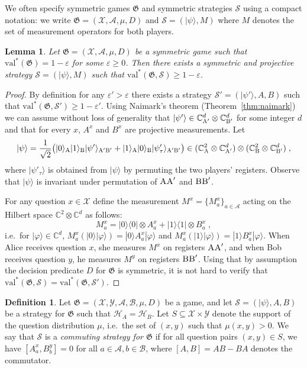 \documentclass[11pt]{article}
\newtheorem{lemma}[theorem]{Lemma}
\theoremstyle{definition}
\newtheorem{definition}[theorem]{Definition}
\newcommand{\ket}[1]{|#1\rangle}
\newcommand{\bra}[1]{\langle#1|}
\newcommand{\ketbra}[2]{\ket{#1}\!\bra{#2}}
\newcommand{\C}{\ensuremath{\mathbb{C}}}
\newcommand{\mH}{\ensuremath{\mathcal{H}}}
\newcommand{\val}{\ensuremath{\mathrm{val}}}
\newcommand{\eps}{\varepsilon}
\newcommand{\game}{\mathfrak{G}}
\newcommand{\strategy}{\mathscr{S}}
\newcommand{\labelstyle}[1]{\ensuremath{\textsc{#1}}\xspace}
\newcommand{\alice}{\labelstyle{A}}
\newcommand{\bob}{\labelstyle{B}}
\renewcommand{\cal}[1]{\mathcal{#1}}
\begin{document}
We often specify symmetric games $\game$ and symmetric strategies $\strategy$ using
  a compact notation: we write $\game = (\cal{X}, \cal{A}, \mu, D)$ and
  $\strategy = (\ket{\psi}, M)$ where $M$ denotes the set of measurement
  operators for both players.

\begin{lemma}\label{lem:symmetric-strat}
  Let $\game = (\cal{X}, \cal{A},  \mu, D)$ be a symmetric game
  such that $\val^*(\game) = 1-\eps$ for some $\eps\geq 0$.
  Then there exists a symmetric and projective strategy
  $\strategy=(\ket{\psi},M)$ such that $\val^*(\game,\strategy)\geq 1-\eps$.
\end{lemma}

\begin{proof}
  By definition for any $\eps'>\eps$ there exists a strategy $\strategy'= (\ket{\psi'},A,B)$ such
  that $\val^*(\game,\strategy')\geq 1-\eps'$.
Using Naimark's theorem (Theorem~\ref{thm:naimark}) we can assume
without loss of generality that $\ket{\psi'}\in\C_{\alice'}^d\otimes \C_{\bob'}^d$ for some integer $d$
  and that for every $x$, $A^x$ and $B^x$ are projective measurements.
Let
  \[
    \ket{\psi} = \frac{1}{\sqrt{2}} \big( \ket{0}_\alice \ket{1}_\bob
    \ket{\psi'}_{\alice'\bob'} + \ket{1}_\alice \ket{0}_\bob
    \ket{\psi'_\tau}_{\alice'\bob'}\big) \in (\C_{\alice}^2 \otimes
    \C_{\alice'}^d) \otimes (\C_\bob^2 \otimes \C_{\bob'}^d)\;,
  \]
  where $\ket{\psi'_\tau}$ is obtained from $\ket{\psi}$ by permuting the two
  players' registers.
  Observe that $\ket{\psi}$ is invariant under permutation of $\alice\alice'$
  and $\bob\bob'$.

  For any question $x\in \cal{X}$ define the measurement $M^x = \{M^x_a\}_{a \in \cal{A}}$
  acting on the Hilbert space $\C^2 \otimes \C^d$ as follows:
  \[
  	M^x_a = \ketbra{0}{0} \otimes A^x_a + \ketbra{1}{1} \otimes B^x_a \;,
  \]
	i.e.\ for $\ket{\varphi} \in \C^d$, $M^x_a(\ket{0}\ket{\varphi})=\ket{0}A^x_a\ket{\varphi}$ and $M^x_a(\ket{1}\ket{\varphi})=\ket{1}B^x_a\ket{\varphi}$.
  When Alice receives question $x$, she measures $M^x$ on registers $\alice \alice'$, and when Bob receives 
  question $y$, he measures $M^y$ on registers $\bob \bob'$.
Using that by assumption the decision predicate $D$ for $\game$ is symmetric,
  it is not hard to verify that $\val^*(\game,\strategy) =
  \val^*(\game,\strategy')$.
\end{proof}

\begin{definition}
  \label{def:comm-strategy}
  Let $\game = (\cal{X}, \cal{Y}, \cal{A}, \cal{B}, \mu, D)$ be a game, and let
  $\strategy = (\ket{\psi}, A, B)$ be a strategy for $\game$ such that  $\mH_A = \mH_B$.
  Let $S \subseteq \cal{X} \times \cal{Y}$ denote the support of the question
  distribution $\mu$, i.e.\ the set of $(x,y)$ such that $\mu(x,y)>0$.
  We say that $\strategy$ is a \emph{commuting strategy for $\game$} if for all
  question pairs $(x, y) \in S$, we have $[A^x_a, B^y_b] = 0$ 
  for all $a
  \in \cal{A}, b \in \cal{B}$, where $[A, B] = AB - BA$ denotes the commutator.
\end{definition}
\end{document}
